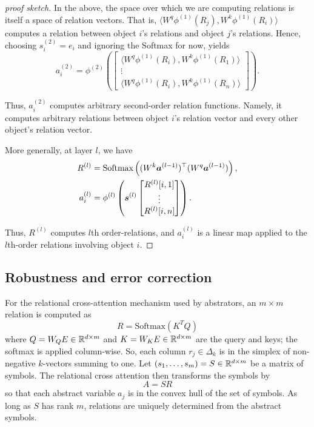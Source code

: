 \begin{proof}[proof sketch]
	In the above, the space over which we are computing relations is itself a space of relation vectors. That is, $\langle W^q \phi^{(1)}(R_j), W^k \phi^{(1)}(R_i) \rangle$ computes a relation between object $i$'s relations and object $j$'s relations. Hence, choosing $s_i^{(2)} = e_i$ and ignoring the Softmax for now, yields
	\begin{equation*}
		a_i^{(2)} = \phi^{(2)}\left(\begin{bmatrix}\langle W^q \phi^{(1)}(R_i), W^k \phi^{(1)}(R_1) \rangle \\ \vdots \\ \langle W^q \phi^{(1)}(R_i), W^k \phi^{(1)}(R_n) \rangle\end{bmatrix}\right).
	\end{equation*}
	
	Thus, $a_i^{(2)}$ computes arbitrary second-order relation functions. Namely, it computes arbitrary relations between object $i$'s relation vector and every other object's relation vector.
	
	More generally, at layer $l$, we have 
	\begin{align*}
		R^{(l)} &= \Softmax\left((W^k \boldsymbol{a}^{(l-1)})^\top (W^q \boldsymbol{a}^{(l-1)})\right),\\
		a_i^{(l)} &= \phi^{(l)}\left(\boldsymbol{s}^{(l)} \begin{bmatrix}R^{(l)}[i,1] \\ \vdots \\ R^{(l)}[i,n]\end{bmatrix}\right).
	\end{align*}
	
	Thus, $R^{(l)}$ computes $l$th order-relations, and $a_i^{(l)}$ is a linear map applied to the $l$th-order relations involving object $i$.
\end{proof}


\subsection{Robustness and error correction}

For the relational cross-attention mechanism used by abstrators, an $m\times m$ relation
is computed as
\begin{equation}
  R = \mbox{Softmax}(K^T Q)
\end{equation}
where $Q = W_Q E\in \mathbb{R}^{d\times m}$ and $K = W_K E\in \mathbb{R}^{d\times m}$ are the query and keys; the softmax is applied column-wise. So, each column $r_j \in \Delta_k$ is in the simplex of
non-negative $k$-vectors summing to one. Let $(s_1,\ldots, s_m) = S\in\mathbb{R}^{d\times m}$ be
a matrix of symbols. The relational cross attention then transforms the symbols by
\begin{equation}
  A = SR
\end{equation}
so that each abstract variable $a_j$ is in the convex hull of the set of symbols.
As long as $S$ has rank $m$, relations are
uniquely determined from the abstract symbols.

